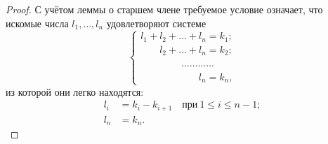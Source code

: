 \documentclass[a4paper,10pt]{amsart}
\theoremstyle{definition}
\theoremstyle{remark}
\begin{document}
\begin{proof}
С учётом леммы о старшем члене требуемое условие означает, что
искомые числа $l_1, \ldots, l_n$ удовлетворяют системе
$$
\begin{cases}
l_1 + l_2 + \ldots + l_n = k_1; \\
\phantom{l_1 + {}} l_2 + \ldots + l_n = k_2;\\
\phantom{l_1 + l_2 + .} \ldots\ldots\ldots\ldots\\
\phantom{l_1 + l_s + \ldots + {}} l_n = k_n,
\end{cases}
$$
из которой они легко находятся:
\begin{align*}
l_i &= k_i - k_{i+1} \quad \text{при} \ 1 \leqslant i \leqslant n-1; \\
l_n &= k_n.
\end{align*}
\end{proof}
\end{document}
